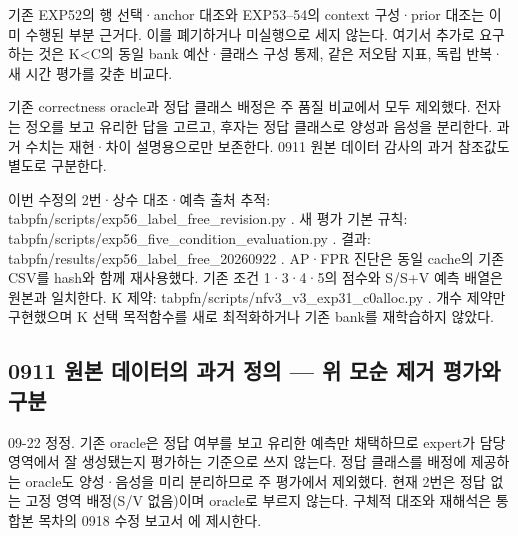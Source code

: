 기존 EXP52의 행 선택·anchor 대조와 EXP53–54의 context 구성·prior 대조는 이미 수행된 부분 근거다. 이를 폐기하거나 미실행으로 세지 않는다. 여기서 추가로 요구하는 것은 K<C의 동일 bank 예산·클래스 구성 통제, 같은 저오탐 지표, 독립 반복·새 시간 평가를 갖춘 비교다.

기존 correctness oracle과 정답 클래스 배정은 주 품질 비교에서 모두 제외했다. 전자는 정오를 보고 유리한 답을 고르고, 후자는 정답 클래스로 양성과 음성을 분리한다. 과거 수치는 재현·차이 설명용으로만 보존한다. 0911 원본 데이터 감사의 과거 참조값도 별도로 구분한다.

이번 수정의 2번·상수 대조·예측 출처 추적: tabpfn/\allowbreak{}scripts/\allowbreak{}exp56\_\allowbreak{}label\_\allowbreak{}free\_\allowbreak{}revision.py . 새 평가 기본 규칙: tabpfn/\allowbreak{}scripts/\allowbreak{}exp56\_\allowbreak{}five\_\allowbreak{}condition\_\allowbreak{}evaluation.py . 결과: tabpfn/\allowbreak{}results/\allowbreak{}exp56\_\allowbreak{}label\_\allowbreak{}free\_\allowbreak{}20260922 . AP·FPR 진단은 동일 cache의 기존 CSV를 hash와 함께 재사용했다. 기존 조건 1·3·4·5의 점수와 S/\allowbreak{}S+\allowbreak{}V 예측 배열은 원본과 일치한다. K 제약: tabpfn/\allowbreak{}scripts/\allowbreak{}nfv3\_\allowbreak{}v3\_\allowbreak{}exp31\_\allowbreak{}c0alloc.py . 개수 제약만 구현했으며 K 선택 목적함수를 새로 최적화하거나 기존 bank를 재학습하지 않았다.

\subsection*{0911 원본 데이터의 과거 정의 — 위 모순 제거 평가와 구분}
09-22 정정. 기존 oracle은 정답 여부를 보고 유리한 예측만 채택하므로 expert가 담당 영역에서 잘 생성됐는지 평가하는 기준으로 쓰지 않는다. 정답 클래스를 배정에 제공하는 oracle도 양성·음성을 미리 분리하므로 주 평가에서 제외했다. 현재 2번은 정답 없는 고정 영역 배정(S/\allowbreak{}V 없음)이며 oracle로 부르지 않는다. 구체적 대조와 재해석은 통합본 목차의 0918 수정 보고서 에 제시한다.

